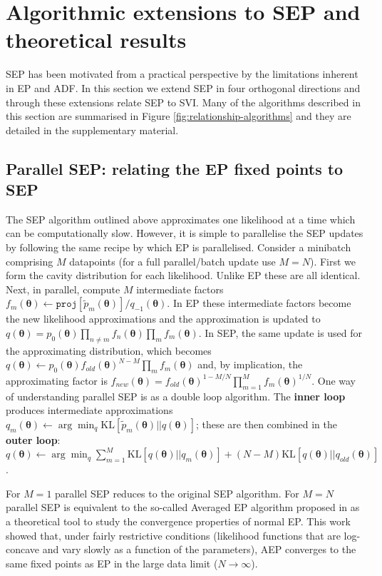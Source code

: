 \section{Algorithmic extensions to SEP and theoretical results}
%
SEP has been motivated from a practical perspective by the limitations inherent in EP and ADF. In this section we extend SEP in four orthogonal directions and through these extensions relate SEP to SVI. Many of the algorithms described in this section are summarised in Figure \ref{fig:relationship-algorithms} and they are detailed in the supplementary material.

%
\subsection{Parallel SEP: relating the EP fixed points to SEP}
%

The SEP algorithm outlined above approximates one likelihood at a time which can be computationally slow. However, it is simple to parallelise the SEP updates by following the same recipe by which EP is parallelised. Consider a minibatch comprising $M$ datapoints (for a full parallel/batch update use $M=N$). First we form the cavity distribution for each likelihood. Unlike EP these are all identical. Next, in parallel, compute $M$ intermediate factors $f_m(\bm{\theta}) \leftarrow \mathtt{proj}[\tilde{p}_m(\bm{\theta})] / q_{-1}(\bm{\theta})$. In EP these intermediate factors become the new likelihood approximations and the approximation is updated to $q(\bm{\theta}) = p_0(\bm{\theta}) \prod_{n \ne m} f_n(\bm{\theta}) \prod_{m} f_m(\bm{\theta}) $. In SEP, the same update is used for the approximating distribution, which becomes $q(\bm{\theta}) \leftarrow p_0(\bm{\theta}) f_{old}(\bm{\theta})^{N-M} \prod_{m} f_m(\bm{\theta}) $ and, by implication, the approximating factor is $f_{new}(\bm{\theta}) = f_{old}(\bm{\theta})^{1-M/N} \prod_{m=1}^M f_m(\bm{\theta})^{1/N}$. One way of understanding parallel SEP is as a double loop algorithm. The \textbf{inner loop} produces intermediate approximations  $q_m(\bm{\theta}) \leftarrow \arg\min_q \mathrm{KL}[\tilde{p}_m(\bm{\theta}) ||q(\bm{\theta})]$; these are then combined in the \textbf{outer loop}: $q(\bm{\theta}) \leftarrow \arg\min_q \sum_{m=1}^M \mathrm{KL}[q(\bm{\theta}) ||q_m(\bm{\theta})] + (N-M) \mathrm{KL}[q(\bm{\theta}) || q_{old}(\bm{\theta})]$.
%

For $M=1$ parallel SEP reduces to the original SEP algorithm. For $M=N$ parallel SEP is equivalent to the so-called Averaged EP algorithm proposed in \cite{barthelme:aep} as a theoretical tool to study the convergence properties of normal EP. This work showed that, under fairly restrictive conditions (likelihood functions that are log-concave and vary slowly as a function of the parameters), AEP converges to the same fixed points as EP in the large data limit ($N \rightarrow \infty$).

